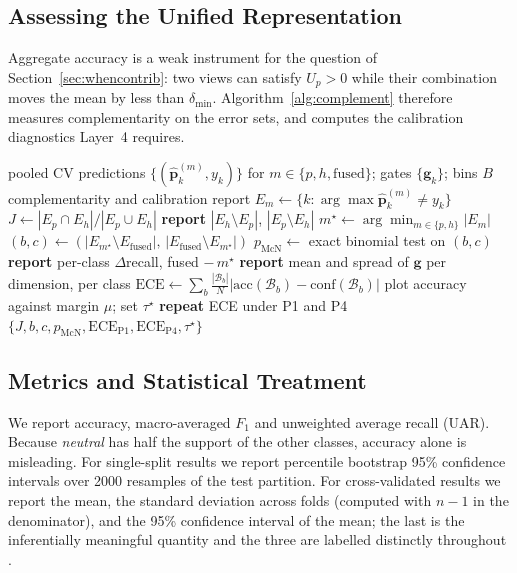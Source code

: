 \documentclass[journal,onecolumn,11pt,draftclsnofoot]{IEEEtran}   %
\begin{document}
\subsection{Assessing the Unified Representation}
\label{sec:complement-method}
Aggregate accuracy is a weak instrument for the question of
Section~\ref{sec:whencontrib}: two views can satisfy $U_p > 0$ while their
combination moves the mean by less than $\delta_{\min}$.
Algorithm~\ref{alg:complement} therefore measures complementarity on the error
sets, and computes the calibration diagnostics Layer~4 requires.

\begin{algorithm}[!t]
\caption{Stream complementarity and posterior calibration}
\label{alg:complement}
\begin{algorithmic}[1]
\Require pooled CV predictions $\{(\hat{\mathbf{p}}^{(m)}_k,y_k)\}$ for
         $m\in\{p,h,\mathrm{fused}\}$; gates $\{\mathbf{g}_k\}$; bins $B$
\Ensure complementarity and calibration report
\State $E_m \gets \{k : \arg\max\hat{\mathbf{p}}^{(m)}_k \neq y_k\}$
\State $J \gets |E_p \cap E_h| / |E_p \cup E_h|$
\State \textbf{report} $|E_h\setminus E_p|$, $|E_p\setminus E_h|$
\State $m^\star \gets \arg\min_{m\in\{p,h\}}|E_m|$
\State $(b,c) \gets (|E_{m^\star}\!\setminus\! E_{\mathrm{fused}}|,\,
       |E_{\mathrm{fused}}\!\setminus\! E_{m^\star}|)$
\State $p_{\mathrm{McN}} \gets$ exact binomial test on $(b,c)$
\State \textbf{report} per-class $\Delta$recall, fused $-\, m^\star$
\State \textbf{report} mean and spread of $\mathbf{g}$ per dimension, per class
\State $\mathrm{ECE} \gets \sum_{b}\frac{|\mathcal{B}_b|}{N}
       |\mathrm{acc}(\mathcal{B}_b)-\mathrm{conf}(\mathcal{B}_b)|$
\State plot accuracy against margin $\mu$; set $\tau^\star$
\State \textbf{repeat} ECE under P1 and P4
\State \Return $\{J,b,c,p_{\mathrm{McN}},\mathrm{ECE}_{\mathrm{P1}},
       \mathrm{ECE}_{\mathrm{P4}},\tau^\star\}$
\end{algorithmic}
\end{algorithm}

\subsection{Metrics and Statistical Treatment}
\label{sec:stats}
We report accuracy, macro-averaged $F_1$ and unweighted average recall (UAR).
Because \emph{neutral} has half the support of the other classes, accuracy alone
is misleading. For single-split results we report percentile bootstrap 95\%
confidence intervals over 2000 resamples of the test partition. For
cross-validated results we report the mean, the standard deviation across folds
(computed with $n-1$ in the denominator), and the 95\% confidence interval of
the mean; the last is the inferentially meaningful quantity and the three are
labelled distinctly throughout \cite{agarwal2021precipice}.
\end{document}

